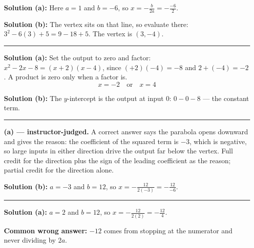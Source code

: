 \documentclass[12pt]{article}
\begin{document}



\textbf{Solution (a):} Here $a = 1$ and $b = -6$, so $x = -\frac{b}{2a} = -\frac{-6}{2}$. 

\textbf{Solution (b):} The vertex sits on that line, so evaluate there: $3^2 - 6(3) + 5 = 9 - 18 + 5$. The vertex is $(3, -4)$. 

\vspace{0.2cm}\noindent\rule{\linewidth}{0.2pt}


\textbf{Solution (a):} Set the output to zero and factor: $x^2 - 2x - 8 = (x + 2)(x - 4)$, since $(+2)(-4) = -8$ and $2 + (-4) = -2$. A product is zero only when a factor is.
\[ \boxed{x = -2 \quad \text{or} \quad x = 4} \]

\textbf{Solution (b):} The $y$-intercept is the output at input $0$: $0 - 0 - 8$ --- the constant term. 

\vspace{0.2cm}\noindent\rule{\linewidth}{0.2pt}


\textbf{(a) --- instructor-judged.} A correct answer says the parabola opens downward and gives the reason: the coefficient of the squared term is $-3$, which is negative, so large inputs in either direction drive the output far below the vertex. Full credit for the direction plus the sign of the leading coefficient as the reason; partial credit for the direction alone.

\textbf{Solution (b):} $a = -3$ and $b = 12$, so $x = -\frac{12}{2(-3)} = -\frac{12}{-6}$. 

\vspace{0.2cm}\noindent\rule{\linewidth}{0.2pt}


\textbf{Solution (a):} $a = 2$ and $b = 12$, so $x = -\frac{12}{2(2)} = -\frac{12}{4}$. 

\textbf{Common wrong answer:} $-12$ comes from stopping at the numerator and never dividing by $2a$.
\end{document}
